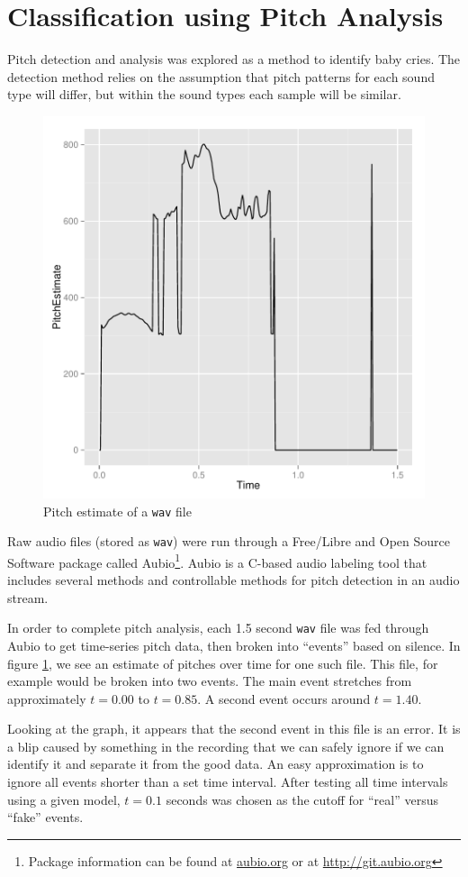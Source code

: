\documentclass[paper=a4, fontsize=11pt]{scrartcl}
\numberwithin{equation}{section}
\numberwithin{figure}{section}
\numberwithin{table}{section}
\begin{document}
\section{Classification using Pitch Analysis}
Pitch detection and analysis was explored as a method to identify baby cries. The detection method relies on the assumption that pitch patterns for each sound type will differ, but within the sound types each sample will be similar.

\begin{figure}
\begin{center}
\vspace{-20pt}
\includegraphics[width=.38\textwidth]{pitch_time.pdf}
\caption{Pitch estimate of a \texttt{wav} file}\label{fig:aubiograph}
\vspace{-20pt}
\end{center}
\end{figure}

Raw audio files (stored as \texttt{wav}) were run through a Free/Libre and Open Source Software package called Aubio\footnote{Package information can be found at \url{aubio.org} or at \url{http://git.aubio.org} }. Aubio is a C-based audio labeling tool that includes several methods and controllable methods for pitch detection in an audio stream.

In order to complete pitch analysis, each 1.5 second \texttt{wav} file was fed through Aubio to get time-series pitch data, then broken into ``events'' based on silence. In figure \ref{fig:aubiograph}, we see an estimate of pitches over time for one such file. This file, for example would be broken into two events. The main event stretches from approximately $t=0.00$ to $t=0.85$. A second event occurs around $t=1.40$.

Looking at the graph, it appears that the second event in this file is an error. It is a blip caused by something in the recording that we can safely ignore if we can identify it and separate it from the good data. An easy approximation is to ignore all events shorter than a set time interval. After testing all time intervals using a given model, $t=0.1$ seconds was chosen as the cutoff for ``real'' versus ``fake'' events.
\end{document}
